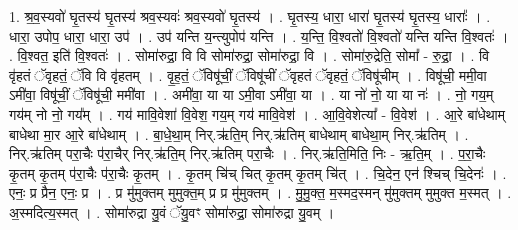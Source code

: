 \documentclass[17pt]{extarticle}
\begin{document}
1. श्र॒व॒स्यवो॑ घृ॒तस्य॑ घृ॒तस्य॑ श्रव॒स्यवः॑ श्रव॒स्यवो॑ घृ॒तस्य॑ । . घृ॒तस्य॒ धारा॒ धारा॑ घृ॒तस्य॑ घृ॒तस्य॒ धाराः᳚ । . धारा॒ उपोप॒ धारा॒ धारा॒ उप॑ । . उप॑ यन्ति य॒न्त्युपोप॑ यन्ति । . य॒न्ति॒ वि॒श्वतो॑ वि॒श्वतो॑ यन्ति यन्ति वि॒श्वतः॑ । . वि॒श्वत॒ इति॑ वि॒श्वतः॑ । . सोमा॑रुद्रा॒ वि वि सोमा॑रुद्रा॒ सोमा॑रुद्रा॒ वि । . सोमा॑रु॒द्रेति॒ सोमा᳚ - रु॒द्रा॒ । . वि वृ॑हतं ॅवृहतं॒ ॅवि वि वृ॑हतम् । . वृ॒ह॒तं॒ ॅविषू॑चीं॒ ॅविषू॑चीं ॅवृहतं ॅवृहतं॒ ॅविषू॑चीम् । . विषू॑ची॒ ममी॒वा ऽमी॑वा॒ विषू॑चीं॒ ॅविषू॑ची॒ ममी॑वा । . अमी॑वा॒ या या ऽमी॒वा ऽमी॑वा॒ या । . या नो॑ नो॒ या या नः॑ । . नो॒ गय॒म् गय॑म् नो नो॒ गय᳚म् । . गय॑ मावि॒वेशा॑ वि॒वेश॒ गय॒म् गय॑ मावि॒वेश॑ । . आ॒वि॒वेशेत्या᳚ - वि॒वेश॑ । . आ॒रे बा॑धेथाम् बाधेथा मा॒र आ॒रे बा॑धेथाम् । . बा॒धे॒था॒म् निर्.ऋ॑ति॒म् निर्.ऋ॑तिम् बाधेथाम् बाधेथा॒म् निर्.ऋ॑तिम् । . निर्.ऋ॑तिम् परा॒चैः प॑रा॒चैर् निर्.ऋ॑ति॒म् निर्.ऋ॑तिम् परा॒चैः । . निर्.ऋ॑ति॒मिति॒ निः - ऋ॒ति॒म् । . प॒रा॒चैः कृ॒तम् कृ॒तम् प॑रा॒चैः प॑रा॒चैः कृ॒तम् । . कृ॒तम् चि॑च् चित् कृ॒तम् कृ॒तम् चि॑त् । . चि॒देन॒ एन॑ श्चिच् चि॒देनः॑ । . एनः॒ प्र प्रैन॒ एनः॒ प्र । . प्र मु॑मुक्तम् मुमुक्त॒म् प्र प्र मु॑मुक्तम् । . मु॒मु॒क्त॒ म॒स्मद॒स्मन् मु॑मुक्तम् मुमुक्त म॒स्मत् । . अ॒स्मदित्य॒स्मत् । . सोमा॑रुद्रा यु॒वं ॅयु॒वꣳ सोमा॑रुद्रा॒ सोमा॑रुद्रा यु॒वम् । \newline
\end{document}
